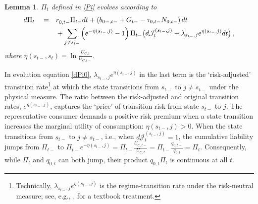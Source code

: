 \documentclass[12pt]{article}
\newtheorem{lemma}[theorem]{Lemma}
\newcommand{\NW}[1]{{\textcolor{blue}{#1}}}
\newcommand{\WJ}[1]{{\textcolor{red}{#1}}}
\begin{document}
\begin{lemma}\label{lemmaPi0}
	$\Pi_t$ defined in \eqref{Pi} evolves according to
	\begin{align}\label{dPi0}
	d\Pi_t  
	\quad =& \quad r^{}_{0, t-}\Pi_{t-}dt 
	+ \left(b_{0-, t-} + G_{t-} - \tau_{0, t-} N_{0, t-} \right)dt   \notag \\
	&\quad + \sum_{j\neq s_{t-}} \left(e^{-\eta(s_{t-}, j)} - 1 \right)\Pi_{t-} 
	\big(d {\mathcal J}_t^{(s_{t-}, j)} 
	- \lambda_{s_{t-}, j} e^{\eta(s_{t-}, j)} dt \big) \, ,
	\end{align}
	where $\eta(s_{t-}, s_t) = \ln\frac{U_{C, t}}{U_{C, t-}}$.  %
\end{lemma}


In evolution equation  \eqref{dPi0},   $ \lambda_{s_{t-}, j} e^{\eta(s_{t-}, j)} $ in the last term is the `risk-adjusted' transition rate\footnote{Technically, $ \lambda_{s_{t-}, j} e^{\eta(s_{t-}, j)} $ is the regime-transition rate under the risk-neutral measure; see, e.g., \cite{duffie2010dynamic}, for a textbook treatment.} %
 at which the state transitions from $s_{t-}$ to $j\neq s_{t-}$ under the physical measure. The ratio between the risk-adjusted and original transition rates, $ e^{\eta(s_{t-}, j)} $,  captures the `price' of transition risk   from state $s_{t-}$ to $j$. The representative consumer demands a positive risk premium when a  state transition increases the marginal utility of consumption:  $\eta(s_{t-}, j)>0$. %
When  the state transitions from $s_{t-}$ to $j\neq s_{t-}$, i.e., when  $d {\mathcal J}_t^{(s_{t-}, j)} =1$, the cumulative liability jumps  from $\Pi_{t-}$ to $\Pi_{t-} e^{-\eta(s_{t-}, j)} =  \Pi_{t-} \frac{U_{C, t-}}{U_{C, t}}= \Pi_{t-} \frac{q_{0, t-}}{q_{0, t}} = \Pi_t .$ Consequently,  while $  \Pi_t$ and $q_{0, t}$ can both jump, their product $q_{0, t}  \Pi_t$ is  continuous at all $t$. %
%


\end{document}
